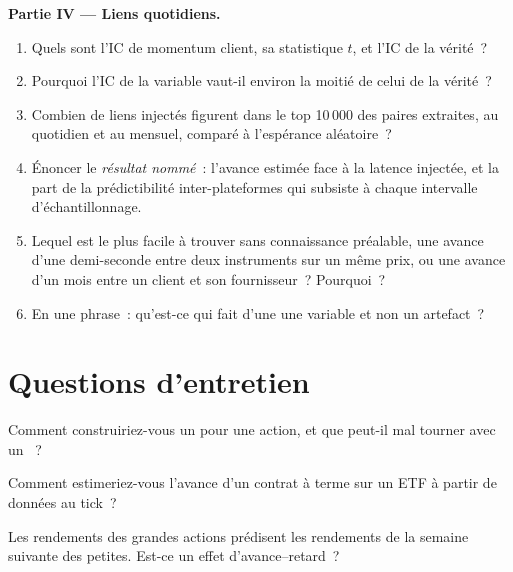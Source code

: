 \begin{problem}
\medskip\noindent\textbf{Partie IV --- Liens quotidiens.}
\begin{enumerate}[resume]
\item Quels sont l'IC de momentum client, sa statistique $t$, et l'IC de la vérité~?
\item Pourquoi l'IC de la variable vaut-il environ la moitié de celui de la vérité~?
\item Combien de liens injectés figurent dans le top 10\,000 des paires extraites, au quotidien et au mensuel, comparé à l'espérance aléatoire~?
\item Énoncer le \emph{résultat nommé}~: l'avance estimée face à la latence injectée, et la part de la prédictibilité inter-plateformes qui subsiste à
chaque intervalle d'échantillonnage.
\item Lequel est le plus facile à trouver sans connaissance préalable, une avance d'une demi-seconde entre deux instruments sur un même prix, ou une avance
d'un mois entre un client et son fournisseur~? Pourquoi~?
\item En une phrase~: qu'est-ce qui fait d'une  une variable et non un artefact~?
\end{enumerate}
\end{problem}

\section{Questions d'entretien}

\begin{interviewq}\label{iq:rs:cross-sectional-and-cross-asset-features:1}
Comment construiriez-vous un  pour une action, et que peut-il mal tourner avec un ~?
\end{interviewq}

\begin{interviewq}\label{iq:rs:cross-sectional-and-cross-asset-features:2}
Comment estimeriez-vous l'avance d'un contrat à terme sur un ETF à partir de données au tick~?
\end{interviewq}

\begin{interviewq}\label{iq:rs:cross-sectional-and-cross-asset-features:3}
Les rendements des grandes actions prédisent les rendements de la semaine suivante des petites. Est-ce un effet d'avance--retard~?
\end{interviewq}


